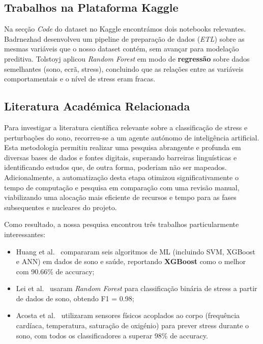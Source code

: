 \documentclass[12pt,a4paper]{article}
\begin{document}
\subsection{Trabalhos na Plataforma Kaggle}

Na secção \textit{Code} do dataset no Kaggle encontrámos dois notebooks relevantes.
Badrnezhad \cite{badrnezhad2024} desenvolveu um pipeline de preparação de dados
(\textit{ETL}) sobre as mesmas variáveis que o nosso dataset contém, sem avançar
para modelação preditiva. Tolstoyj \cite{tolstoyj2024} aplicou \textit{Random Forest}
em modo de \textbf{regressão} sobre dados semelhantes (sono, ecrã, stress), concluindo
que as relações entre as variáveis comportamentais e o nível de stress eram fracas.

\subsection{Literatura Académica Relacionada}

Para investigar a literatura científica relevante sobre a classificação de stress 
e perturbações do sono, recorreu-se a um agente autónomo de inteligência artificial. 
Esta metodologia permitiu realizar uma pesquisa abrangente e profunda em diversas bases
de dados e fontes digitais, superando barreiras linguísticas e identificando 
estudos que, de outra forma, poderiam não ser mapeados. 
Adicionalmente, a automatização desta etapa otimizou significativamente o tempo de 
computação e pesquisa em comparação com uma revisão manual, viabilizando uma alocação 
mais eficiente de recursos e tempo para as fases subsequentes e nucleares do projeto.

Como resultado, a nossa pesquisa encontrou três trabalhos particularmente interessantes:
\begin{itemize}
  \item Huang et al.\ \cite{huang2024} compararam seis algoritmos de ML (incluindo SVM,
    XGBoost e ANN) em dados de sono e saúde, reportando \textbf{XGBoost} como o melhor
    com 90.66\% de accuracy;
  \item Lei et al.\ \cite{lei2024} usaram \textit{Random Forest} para classificação
    binária de stress a partir de dados de sono, obtendo F1 = 0.98;
  \item Acosta et al.\ \cite{acosta2025} utilizaram sensores físicos acoplados ao corpo
    (frequência cardíaca, temperatura, saturação de oxigénio) para prever stress durante
    o sono, com todos os classificadores a superar 98\% de accuracy.
\end{itemize}
\end{document}
